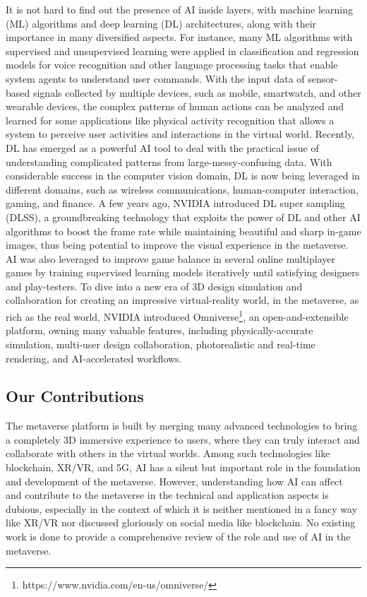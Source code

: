 \documentclass[journal]{IEEEtran}
\begin{document}
It is not hard to find out the presence of AI inside layers, with machine learning (ML) algorithms and deep learning (DL) architectures, along with their importance in many diversified aspects. 
For instance, many ML algorithms with supervised and unsupervised learning were applied in classification and regression models for voice recognition and other language processing tasks that enable system agents to understand user commands.
With the input data of sensor-based signals collected by multiple devices, such as mobile, smartwatch, and other wearable devices, the complex patterns of human actions can be analyzed and learned for some applications like physical activity recognition that allows a system to perceive user activities and interactions in the virtual world.
Recently, DL has emerged as a powerful AI tool to deal with the practical issue of understanding complicated patterns from large-messy-confusing data.
With considerable success in the computer vision domain, DL is now being leveraged in different domains, such as wireless communications, human-computer interaction, gaming, and finance. 
A few years ago, NVIDIA introduced DL super sampling (DLSS), a groundbreaking technology that exploits the power of DL and other AI algorithms to boost the frame rate while maintaining beautiful and sharp in-game images, thus being potential to improve the visual experience in the metaverse. 
AI was also leveraged to improve game balance in several online multiplayer games by training supervised learning models iteratively until satisfying designers and play-testers.
To dive into a new era of 3D design simulation and collaboration for creating an impressive virtual-reality world, in the metaverse, as rich as the real world, NVIDIA introduced Omniverse\footnote{https://www.nvidia.com/en-us/omniverse/}, an open-and-extensible platform, owning many valuable features, including physically-accurate simulation, multi-user design collaboration, photorealistic and real-time rendering, and AI-accelerated workflows.


\subsection{Our Contributions}
The metaverse platform is built by merging many advanced technologies to bring a completely 3D immersive experience to users, where they can truly interact and collaborate with others in the virtual worlds. Among such technologies like blockchain, XR/VR, and 5G, AI has a silent but important role in the foundation and development of the metaverse. However, understanding how AI can affect and contribute to the metaverse in the technical and application aspects is dubious, especially in the context of which it is neither mentioned in a fancy way like XR/VR nor discussed gloriously on social media like blockchain. No existing work is done to provide a comprehensive review of the role and use of AI in the metaverse. 
\end{document}
